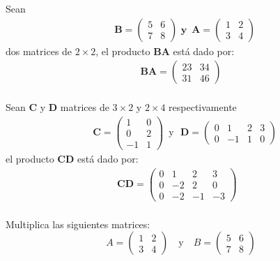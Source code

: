 \begin{}
\begin{example}
Sean 
$$\begin{aligned}
  & \boldsymbol{B}=\left(\begin{array}{ll}
5 & 6 \\
7 & 8
\end{array}\right)\,\,\textbf{y}\,\,\,\boldsymbol{A}=\left(\begin{array}{ll}
1 & 2 \\
3 & 4
\end{array}\right)
\end{aligned}$$ dos matrices de $2\times2$,
el producto $\boldsymbol{BA}$ está dado por:
$$\begin{aligned}
\boldsymbol{BA}=\left(\begin{array}{ll}
23 & 34 \\
31 & 46
\end{array}\right) \\
\end{aligned}$$
\end{example}
\begin{example}
Sean $\boldsymbol{C}$ y $\boldsymbol{D}$ matrices de $3\times2$ y $2\times4$ respectivamente
$$ 
\begin{aligned}
& \boldsymbol{C}=\left(\begin{array}{cc}
1 & 0 \\
0 & 2 \\
-1 & 1
\end{array}\right) \,\,\,\text{y}\,\,\,\,\boldsymbol{D}=\left(\begin{array}{cccc}
0 & 1 & 2 & 3 \\
0 & -1 & 1 & 0
\end{array}\right)
\end{aligned}$$
el producto $\boldsymbol{CD}$ está dado por:
$$\begin{aligned}
\boldsymbol{CD}=\left(\begin{array}{cccc}
0 & 1 & 2 & 3 \\
0 & -2 & 2 & 0 \\
0 & -2 & -1 & -3
\end{array}\right) \\
&      
\end{aligned}$$
\end{example}
\begin{exercise}
Multiplica las siguientes matrices:
\[ A = \begin{pmatrix} 1 & 2 \\ 3 & 4 \end{pmatrix} \quad \text{y} \quad B = \begin{pmatrix} 5 & 6 \\ 7 & 8 \end{pmatrix} \]

\end{exercise}
\end{}
